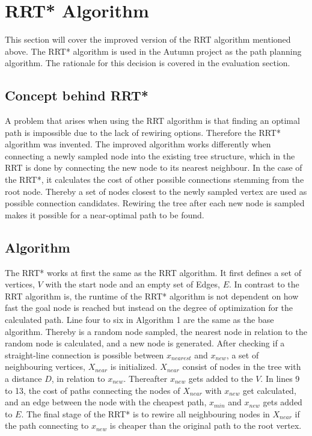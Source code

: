\section{RRT* Algorithm}

This section will cover the improved version of the RRT algorithm mentioned above. The RRT* algorithm is used in the Autumn project as the path planning algorithm. The rationale for this decision is covered in the evaluation section. 

\subsection{Concept behind RRT*}

A problem that arises when using the RRT algorithm is that finding an optimal path is impossible due to the lack of rewiring options. Therefore the RRT* algorithm was invented. 
The improved algorithm works differently when connecting a newly sampled node into the existing tree structure, which in the RRT is done by connecting the new node to its nearest neighbour. In the case of the RRT*, it calculates the cost of other possible connections stemming from the root node. Thereby a set of nodes closest to the newly sampled vertex are used as possible connection candidates. Rewiring the tree after each new node is sampled makes it possible for a near-optimal path to be found.

\subsection{Algorithm}

The RRT* works at first the same as the RRT algorithm. It first defines a set of vertices, $V$ with the start node and an empty set of Edges, $E$. In contrast to the RRT algorithm is, the runtime of the RRT* algorithm is not dependent on how fast the goal node is reached but instead on the degree of optimization for the calculated path.
Line four to six in Algorithm 1 are the same as the base algorithm. Thereby is a random node sampled, the nearest node in relation to the random node is calculated, and a new node is generated. After checking if a straight-line connection is possible between $x_{nearest}$ and $x_{new}$, a set of neighbouring vertices, $X_{near}$ is initialized.
$X_{near}$ consist of nodes in the tree with a distance $D$, in relation to $x_{new}$. Thereafter $x_{new}$ gets added to the $V$. In lines 9 to 13, the cost of paths connecting the nodes of $X_{near}$ with $x_{new}$ get calculated, and an edge between the node with the cheapest path, $x_{min}$ and $x_{new}$ gets added to $E$. The final stage of the RRT* is to rewire all neighbouring nodes in $X_{near}$ if the path connecting to $x_{new}$ is cheaper than the original path to the root vertex. 


